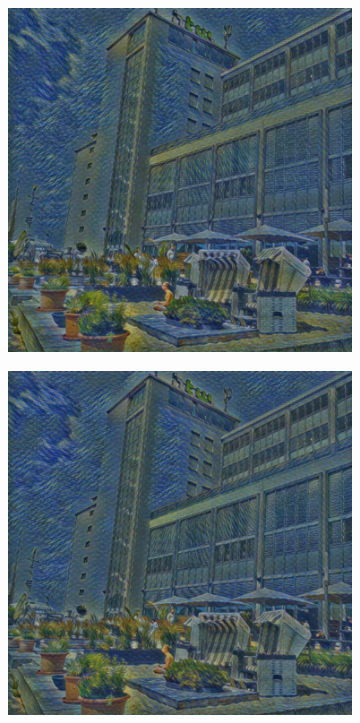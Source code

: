 \begin{figure}[H]
    \begin{subfigure}[h]{0.15\textwidth}
        \centering
        \includegraphics[width=\textwidth]{resources/content/experiments/net7.jpg}
    \end{subfigure}
    \begin{subfigure}[h]{0.15\textwidth}
        \centering
        \includegraphics[width=\textwidth]{resources/content/experiments/net8.jpg}

\end{subfigure}
\end{figure}

